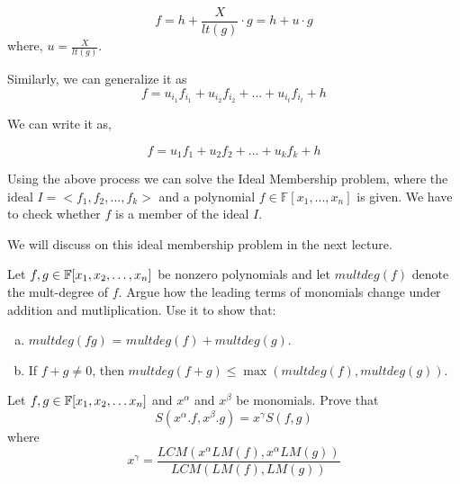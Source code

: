 $$ f = h + \frac{X}{lt(g)}\cdot g  = h + u\cdot g$$ where, $u = \frac{X}{lt(g)}$.

Similarly, we can generalize it as
$$ f = u_{i_1}f_{i_1} + u_{i_2}f_{i_2} + ... + u_{i_t}f_{i_t} + h $$

We can write it as,

$$ f = u_1f_1 + u_2f_2 + ... + u_kf_k + h $$

\begin{observation}
Using the above process we can solve the Ideal Membership problem, where the ideal $ I = <f_1,f_2,...,f_k>$ and a polynomial $f \in \mathbb{F}[x_1,...,x_n]$ is given. We have to check whether $f$ is a member of the ideal $I$.

\end{observation}


We will discuss on this ideal membership problem in the next lecture.

\begin{exercise}
Let $f,g \in {\mathbb{F}}[x_1, x_2, \ldots, x_n]$ be nonzero polynomials and let $multdeg(f)$ denote the mult-degree of $f$. Argue how the leading terms of monomials change under addition and mutliplication. Use it to show that:
\begin{enumerate}[(a)]
\item $multdeg(fg)$ = $multdeg(f)+multdeg(g)$.
\item If $f+g \ne 0$, then $multdeg(f+g) \le \max(multdeg(f),multdeg(g))$.
\end{enumerate}
\end{exercise}


\begin{exercise}
Let $f, g \in {\mathbb{F}}[x_1, x_2, \ldots x_n]$ and $x^\alpha$ and $x^\beta$ be monomials. Prove that 
\[ S(x^\alpha.f,x^\beta.g) = x^\gamma S(f,g) \]
where
\[ x^\gamma = \frac{LCM(x^\alpha LM(f),x^\alpha LM(g))}{LCM(LM(f),LM(g))} \]
\end{exercise}

